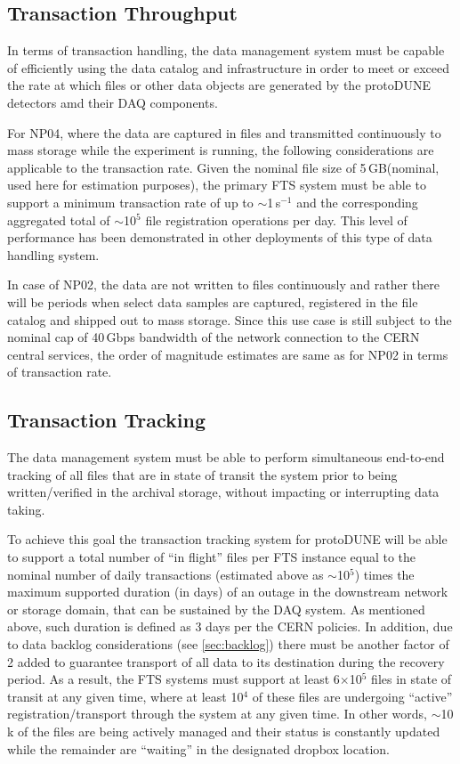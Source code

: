 \documentclass[12pt]{article}
\newcommand{\pd}{protoDUNE\xspace}
\newcommand{\filesize}{5\,GB\xspace}
\begin{document}
\subsection{Transaction Throughput}

In terms of transaction handling,  the data management system must be capable of efficiently using the data
catalog and infrastructure in order to meet or exceed the rate at which files or other data
objects are generated by the \pd detectors amd their DAQ components.

For NP04, where the data are captured in files and transmitted continuously to mass storage while
the experiment is running, the following considerations are applicable to the transaction rate.
Given the nominal file size of \filesize (nominal, used here for estimation purposes), 
the primary FTS system must be able to support a minimum transaction rate of up to  $\sim$1\,s$^{-1}$
and the corresponding aggregated total of $\sim$10$^5$ file registration operations per day.
This level of performance has been demonstrated in other deployments of this type of data
handling system.

In case of NP02, the data are not written to files continuously and rather there will be periods when
select data samples are captured, registered in the file catalog and shipped out to mass storage.
Since this use case is still subject to the nominal cap of 40\,Gbps bandwidth of the network connection
to the CERN central services, the order of magnitude estimates are same as for NP02 in terms of transaction rate.

\subsection{Transaction Tracking}
The data management system must be able to perform simultaneous end-to-end tracking
of all files that are in state of transit the system prior to being written/verified in the archival storage,
without impacting or interrupting data taking. 

To achieve this goal the transaction tracking system for \pd will be
able to support a total number of ``in flight'' files per FTS instance equal to the nominal number of daily transactions
(estimated above as $\sim$10$^5$) times the maximum supported duration (in days)
of an outage in the downstream network or storage domain, that can be sustained by the DAQ system.
As mentioned above, such duration is defined as 3 days per the CERN policies. In addition, due to data backlog considerations
(see \ref{sec:backlog}) there must be another factor of 2 added to guarantee transport of all data to its destination during
the recovery period. As a result, the FTS systems must support at least 6$\times$10$^5$ files in state of transit at any given time,
where at least 10$^4$ of these files are undergoing ``active'' registration/transport through the system at any given time.
In other words, $\sim$10\,k of the files are being actively
managed and their status is constantly updated while the remainder are ``waiting'' in the designated dropbox location.
\end{document}
